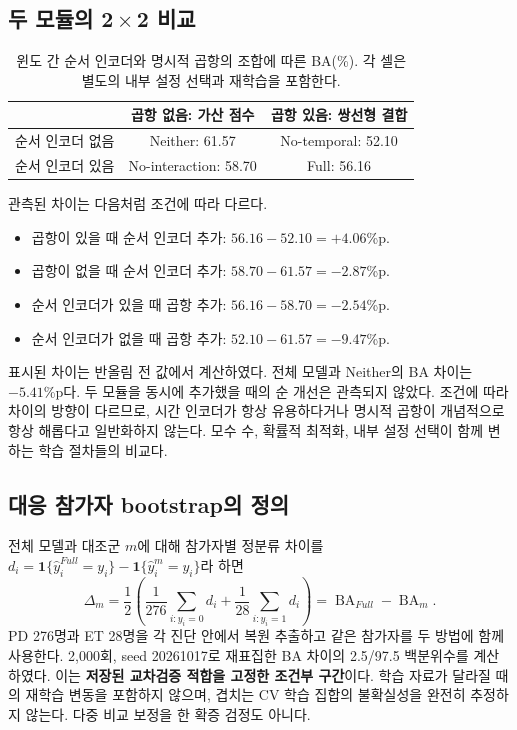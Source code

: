 \documentclass[11pt,a4paper]{article}
\newcommand{\ind}{\mathbf{1}}
\DeclareMathOperator{\BA}{BA}
\numberwithin{equation}{section}
\begin{document}
\subsection{두 모듈의 2\,$\times$\,2 비교}
\begin{table}[H]\centering\small
\caption{윈도 간 순서 인코더와 명시적 곱항의 조합에 따른 BA(\%).
각 셀은 별도의 내부 설정 선택과 재학습을 포함한다.}
\begin{tabular}{@{}lcc@{}}\toprule
 & 곱항 없음: 가산 점수 & 곱항 있음: 쌍선형 결합\\\midrule
 순서 인코더 없음 & Neither: 61.57 & No-temporal: 52.10\\
 순서 인코더 있음 & No-interaction: 58.70 & Full: 56.16\\\bottomrule
\end{tabular}\label{tab:factorial}
\end{table}
관측된 차이는 다음처럼 조건에 따라 다르다.
\begin{itemize}
 \item 곱항이 있을 때 순서 인코더 추가: $56.16-52.10=+4.06$\%p.
 \item 곱항이 없을 때 순서 인코더 추가: $58.70-61.57=-2.87$\%p.
 \item 순서 인코더가 있을 때 곱항 추가: $56.16-58.70=-2.54$\%p.
 \item 순서 인코더가 없을 때 곱항 추가: $52.10-61.57=-9.47$\%p.
\end{itemize}
표시된 차이는 반올림 전 값에서 계산하였다. 전체 모델과 Neither의 BA 차이는
$-5.41$\%p다. 두 모듈을 동시에 추가했을 때의 순 개선은 관측되지 않았다.
조건에 따라 차이의 방향이 다르므로, 시간 인코더가 항상 유용하다거나
명시적 곱항이 개념적으로 항상 해롭다고 일반화하지 않는다.
모수 수, 확률적 최적화, 내부 설정 선택이 함께 변하는 학습 절차들의 비교다.

\subsection{대응 참가자 bootstrap의 정의}
전체 모델과 대조군 $m$에 대해 참가자별 정분류 차이를
$d_i=\ind\{\widehat y_i^{Full}=y_i\}-\ind\{\widehat y_i^m=y_i\}$라 하면
\begin{equation}
 \Delta_m=\frac12\left(\frac1{276}\sum_{i:y_i=0}d_i+
 \frac1{28}\sum_{i:y_i=1}d_i\right)
 =\BA_{Full}-\BA_m.
\end{equation}
PD 276명과 ET 28명을 각 진단 안에서 복원 추출하고 같은 참가자를 두 방법에
함께 사용한다. 2,000회, seed 20261017로 재표집한 BA 차이의 2.5/97.5
백분위수를 계산하였다. 이는 \textbf{저장된 교차검증 적합을 고정한 조건부 구간}이다.
학습 자료가 달라질 때의 재학습 변동을 포함하지 않으며, 겹치는 CV 학습 집합의
불확실성을 완전히 추정하지 않는다. 다중 비교 보정을 한 확증 검정도 아니다.
\end{document}
